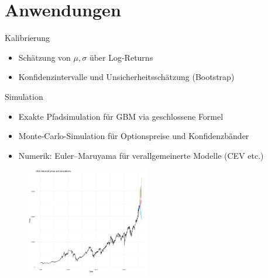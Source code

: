 \documentclass{beamer}
\begin{document}
\section{Anwendungen}

\begin{frame}{Kalibrierung}
  \begin{itemize}
      \item Schätzung von $\mu,\sigma$ über Log-Returns
      \item Konfidenzintervalle und Unsicherheitsschätzung (Bootstrap)
  \end{itemize}
\end{frame}

\begin{frame}{Simulation}
  \begin{itemize}
      \item Exakte Pfadsimulation für GBM via geschlossene Formel
      \item Monte-Carlo-Simulation für Optionspreise und Konfidenzbänder
      \item Numerik: Euler--Maruyama für verallgemeinerte Modelle (CEV etc.)
  \end{itemize}
  \begin{figure}
    \centering
  \includegraphics[width=0.48\textwidth]{../thesis/images/dax_monte_carlo.png}
  \end{figure}
\end{frame}
\end{document}
